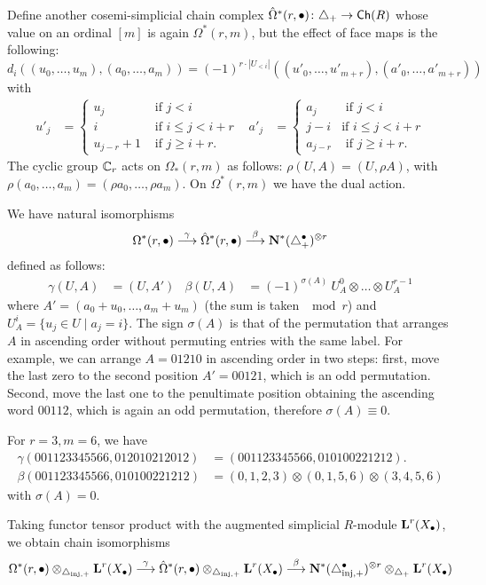 Define another cosemi-simplicial chain complex $\hat{\Omega}^*(r,\bullet)\colon \asimplex\to \Ch{R}$ whose value on an ordinal $[m]$ is again $\Omega^*(r,m)$, but the effect of face maps is the following:
\[d_i((u_0,\ldots,u_m), (a_0,\ldots,a_m)) = (-1)^{r\cdot |U_{< i}|}((u'_0,\ldots,u'_{m+r}),(a'_0,\ldots,a'_{m+r}))\] with
\begin{align}\label{eq:Omegahat}
    u'_j &= 
        \begin{cases} 
            u_j &\text{ if $j<i$} \\ 
            i & \text{ if $i\leq j < i+r$} \\ 
            u_{j-r} + 1 & \text{ if $j\geq i+r$.}
        \end{cases} 
        &
	a'_j &= 
        \begin{cases} 
            a_j &\text{ if $j<i$} \\
            j-i & \text{if $i\leq j<i+r$} \\ 
            a_{j-r} & \text{ if $j\geq i+r$.}
        \end{cases}
\end{align}
The cyclic group $\Cyc_r$ acts on $\Omega_*(r,m)$ as follows: $\rho(U,A) = (U,\rho A)$, with $\rho(a_0,\ldots,a_m) = (\rho a_0,\ldots,\rho a_m)$. On $\Omega^*(r,m)$ we have the dual action.

We have natural isomorphisms
\[\Omega^*(r,\bullet)\overset{\gamma}{\lra} \hat{\Omega}^*(r,\bullet)\overset{\beta}{\lra} \NN^*(\asimplex^\bullet)^{\otimes r}\]
defined as follows:
\begin{align*}
    \gamma(U,A) &= (U,A') 
    &
    \beta(U,A) &= (-1)^{\sigma(A)}\ U_A^0\otimes \ldots\otimes U_A^{r-1}
\end{align*}
where $A' = (a_0+u_0,\ldots,a_m+u_m)$ (the sum is taken $\mod r$) and $U_A^i = \{u_j\in U\mid a_j=i\}$. The sign $\sigma(A)$ is that of the permutation that arranges $A$ in ascending order without permuting entries with the same label. For example, we can arrange $A=01210$ in ascending order in two steps: first, move the last zero to the second position $A' = 00121$, which is an odd permutation. Second, move the last one to the penultimate position obtaining the ascending word $00112$, which is again an odd permutation, therefore $\sigma(A) \equiv 0$.

\begin{example}\label{ex:103} For $r=3,m=6$, we have
    \begin{align*}                  \gamma(001123345566,012010212012) &= (001123345566,010100221212).
        \\
        \beta(001123345566,010100221212) &= (0,1,2,3)\otimes (0,1,5,6)\otimes (3,4,5,6)
    \end{align*}
    with $\sigma(A) = 0$.
\end{example}
Taking functor tensor product with the augmented simplicial $R$-module $\AA^r(X_\bullet)$, we obtain chain isomorphisms
\[\Omega^*(r,\bullet)\otimes_{\asimplexinj} \AA^r(X_\bullet)\overset{\gamma}{\lra} \hat{\Omega}^*(r,\bullet)\otimes_{\asimplexinj} \AA^r(X_\bullet)\overset{\beta}{\lra} \NN^*(\asimplexinj^\bullet)^{\otimes r}\otimes_{\asimplex} \AA^r(X_\bullet)\]





